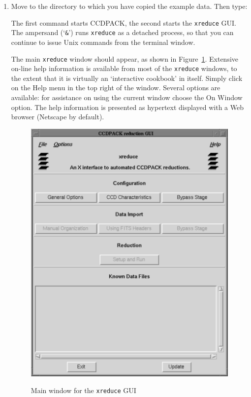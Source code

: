 \documentclass[twoside,11pt]{starlink}
\begin{document}
\begin{enumerate}

  \item Move to the directory to which you have copied the example data.
   Then type:

\begin{terminalv}
\end{terminalv}

   The first command starts CCDPACK, the second starts the \texttt{xreduce}
   GUI.  The ampersand (`\texttt{\&}') runs \texttt{xreduce} as a detached
   process, so that you can continue to issue Unix commands from the
   terminal window.

   The main \texttt{xreduce} window should appear, as shown in
   Figure~\ref{XREDUCE}.  Extensive on-line help information is available
   from most of the \texttt{xreduce} windows, to the extent that it is
   virtually an `interactive cookbook' in itself.  Simply click on the \textsf{Help} menu in the top right of the window.  Several options are available:
   for assistance on using the current window choose the \textsf{On Window}
   option.  The help information is presented as hypertext displayed with
   a Web browser (Netscape by default).

  \begin{figure}[htbp]
     \centering
      \includegraphics[totalheight=5in]{sc5_xreduce}
      \begin{quote}
      \caption{Main window for the \texttt{xreduce} GUI
      \label{XREDUCE} }
      \end{quote}
  \end{figure}


\end{enumerate}
\end{document}
